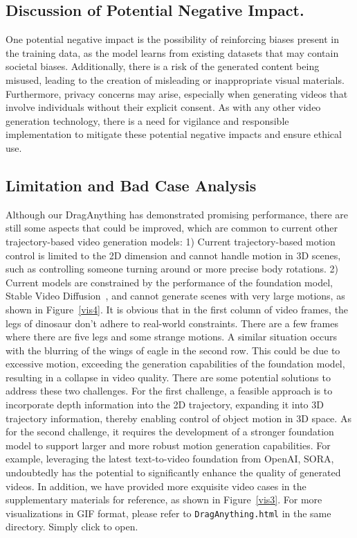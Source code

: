 \documentclass[runningheads]{llncs}
\newcommand{\ours}{\textup{DragAnything}\xspace}
\begin{document}
\subsection{Discussion of Potential Negative Impact.}
One potential negative impact is the possibility of reinforcing biases present in the training data, as the model learns from existing datasets that may contain societal biases. 
%
Additionally, there is a risk of the generated content being misused, leading to the creation of misleading or inappropriate visual materials.
%
Furthermore, privacy concerns may arise, especially when generating videos that involve individuals without their explicit consent.
%
As with any other video generation technology, there is a need for vigilance and responsible implementation to mitigate these potential negative impacts and ensure ethical use.


\subsection{Limitation and Bad Case Analysis} Although our \ours has demonstrated promising performance, there are still some aspects that could be improved, which are common to current other trajectory-based video generation models: 1) Current trajectory-based motion control is limited to the 2D dimension and cannot handle motion in 3D scenes, such as controlling someone turning around or more precise body rotations.
%
2) Current models are constrained by the performance of the foundation model, Stable Video Diffusion~\cite{blattmann2023stable}, and cannot generate scenes with very large motions, as shown in Figure~\ref{vis4}.
%
It is obvious that in the first column of video frames, the legs of dinosaur don't adhere to real-world constraints. 
%
There are a few frames where there are five legs and some strange motions.
%
A similar situation occurs with the blurring of the wings of eagle in the second row.
%
This could be due to excessive motion, exceeding the generation capabilities of the foundation model, resulting in a collapse in video quality.
%
There are some potential solutions to address these two challenges.
%
For the first challenge, a feasible approach is to incorporate depth information into the 2D trajectory, expanding it into 3D trajectory information, thereby enabling control of object motion in 3D space.
%
As for the second challenge, it requires the development of a stronger foundation model to support larger and more robust motion generation capabilities.
%
For example, leveraging the latest text-to-video foundation from OpenAI, SORA, undoubtedly has the potential to significantly enhance the quality of generated videos.
%
In addition, we have provided more exquisite video cases in the supplementary materials for reference, as shown in Figure~\ref{vis3}.
%
For more visualizations in GIF format, please refer to \texttt{DragAnything.html} in the same directory. Simply click to open.




\end{document}
